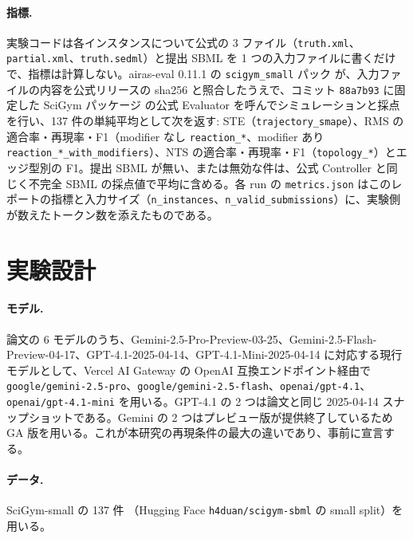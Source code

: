 \documentclass{article}
\begin{document}
\paragraph{指標.}
実験コードは各インスタンスについて公式の 3 ファイル（\texttt{truth.xml}、\texttt{partial.xml}、\texttt{truth.sedml}）と提出 SBML を 1 つの入力ファイルに書くだけで、指標は計算しない。airas-eval 0.11.1 の \texttt{scigym\_small} パック \citep{airasorg-2026-airas} が、入力ファイルの内容を公式リリースの sha256 と照合したうえで、コミット \texttt{88a7b93} に固定した SciGym パッケージ \cite[s3.p1]{airasorg-2026-airas} の公式 Evaluator を呼んでシミュレーションと採点を行い、137 件の単純平均として次を返す: STE（\texttt{trajectory\_smape}）、RMS の適合率・再現率・F1（modifier なし \texttt{reaction\_*}、modifier あり \texttt{reaction\_*\_with\_modifiers}）、NTS の適合率・再現率・F1（\texttt{topology\_*}）とエッジ型別の F1。提出 SBML が無い、または無効な件は、公式 Controller と同じく不完全 SBML の採点値で平均に含める。各 run の \texttt{metrics.json} はこのレポートの指標と入力サイズ（\texttt{n\_instances}、\texttt{n\_valid\_submissions}）に、実験側が数えたトークン数を添えたものである。

\section{実験設計}
\label{sec:design}
\paragraph{モデル.}
論文の 6 モデルのうち、Gemini-2.5-Pro-Preview-03-25、Gemini-2.5-Flash-Preview-04-17、GPT-4.1-2025-04-14、GPT-4.1-Mini-2025-04-14 \cite[s1.p1]{duan-2025-measuring} に対応する現行モデルとして、Vercel AI Gateway の OpenAI 互換エンドポイント経由で \texttt{google/gemini-2.5-pro}、\texttt{google/gemini-2.5-flash}、\texttt{openai/gpt-4.1}、\texttt{openai/gpt-4.1-mini} を用いる。GPT-4.1 の 2 つは論文と同じ 2025-04-14 スナップショットである。Gemini の 2 つはプレビュー版が提供終了しているため GA 版を用いる。これが本研究の再現条件の最大の違いであり、事前に宣言する。

\paragraph{データ.}
SciGym-small の 137 件 \cite[s1.p2]{duan-2025-measuring}（Hugging Face \texttt{h4duan/scigym-sbml} の small split）を用いる。
\end{document}

